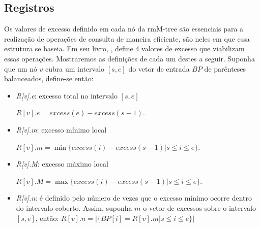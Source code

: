 \subsection{Registros}
Os valores de excesso definido em cada nó da rmM-tree são essenciais para a realização de operações de consulta de maneira eficiente, são neles em que essa estrutura se baseia.  Em seu livro, \citeauthor{book-compact-data-structures} ,
define 4 valores de excesso que viabilizam essas operações. Mostraremos as definições de cada um destes a seguir. Suponha que um nó $v$ cubra um intervalo $[s,e]$ do vetor de entrada $BP$ de parênteses balanceados, define-se então:
\begin{itemize}
    \item \textit{R[v].e}: excesso total no intervalo $[s,e]$
    
    $R[v].e = excess(e) - excess(s-1)$.
    \item \textit{R[v].m}: excesso mínimo local
    
    $R[v].m = \min\{excess(i) - excess(s - 1) | s \leq i \leq e\}$.
    \item \textit{R[v].M}: excesso máximo local
    
    $R[v].M = \max\{excess(i) - excess(s - 1) | s \leq i \leq e\}$.
    
    \item \textit{R[v].n}: é definido pelo número de vezes que o excesso mínimo ocorre dentro do intervalo coberto. Assim, suponha $m$ o vetor de excessos sobre o intervalo $[s,e]$, então:
    $R[v].n = |\{BP[i]=R[v].m | s \leq i \leq e\}|$
\end{itemize}


